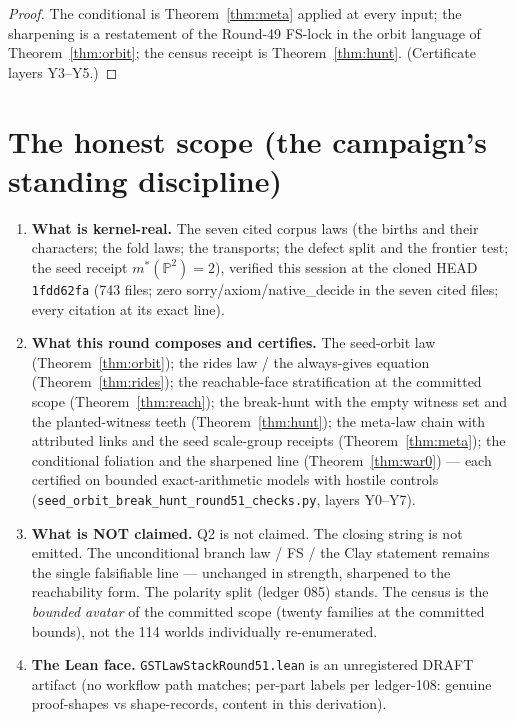 \documentclass[11pt]{article}
\begin{document}
\begin{proof}
The conditional is Theorem~\ref{thm:meta} applied at every input; the sharpening is a restatement of the Round-49 FS-lock in the orbit language of Theorem~\ref{thm:orbit}; the census receipt is Theorem~\ref{thm:hunt}. (Certificate layers Y3--Y5.) \qedhere
\end{proof}

\section{The honest scope (the campaign's standing discipline)}

\begin{enumerate}
\item \textbf{What is kernel-real.} The seven cited corpus laws (the births and their characters; the fold laws; the transports; the defect split and the frontier test; the seed receipt $m^*(\mathbb P^2)=2$), verified this session at the cloned HEAD \texttt{1fdd62fa} (743 files; zero sorry/axiom/native\_decide in the seven cited files; every citation at its exact line).
\item \textbf{What this round composes and certifies.} The seed-orbit law (Theorem~\ref{thm:orbit}); the rides law / the always-gives equation (Theorem~\ref{thm:rides}); the reachable-face stratification at the committed scope (Theorem~\ref{thm:reach}); the break-hunt with the empty witness set and the planted-witness teeth (Theorem~\ref{thm:hunt}); the meta-law chain with attributed links and the seed scale-group receipts (Theorem~\ref{thm:meta}); the conditional foliation and the sharpened line (Theorem~\ref{thm:war0}) --- each certified on bounded exact-arithmetic models with hostile controls (\texttt{seed\_orbit\_break\_hunt\_round51\_checks.py}, layers Y0--Y7).
\item \textbf{What is NOT claimed.} Q2 is not claimed. The closing string is not emitted. The unconditional branch law / FS / the Clay statement remains the single falsifiable line --- unchanged in strength, sharpened to the reachability form. The polarity split (ledger 085) stands. The census is the \emph{bounded avatar} of the committed scope (twenty families at the committed bounds), not the 114 worlds individually re-enumerated.
\item \textbf{The Lean face.} \texttt{GSTLawStackRound51.lean} is an unregistered DRAFT artifact (no workflow path matches; per-part labels per ledger-108: genuine proof-shapes vs shape-records, content in this derivation).
\end{enumerate}
\end{document}
